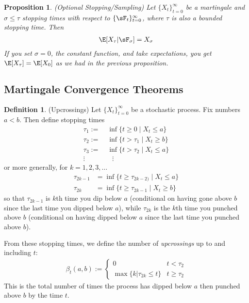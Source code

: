 \documentclass[12pt]{article}
\theoremstyle{plain}
\newtheorem{prop}[thm]{Proposition}
\theoremstyle{definition}
\newtheorem{defn}[thm]{Definition}
\theoremstyle{remark}
\newcommand{\tinfz}{_{t=0}^\infty}
\begin{document}
\begin{prop}\emph{(Optional Stopping/Sampling)}
Let $\{X_t\}\tinfz$ be a martingale and $\sigma \leq \tau$ stopping
times with respect to $\{\sF_t\}\tinfz$, where $\tau$ is also a bounded
stopping time. Then
\begin{align*}
  \E[X_\tau |\sF_\sigma] = X_\sigma
\end{align*}
If you set $\sigma=0$, the constant function, and take expectations, you
get $\E[X_\tau]=\E[X_0]$ as we had in the previous proposition.
\end{prop}

\clearpage
\subsection{Martingale Convergence Theorems}

\begin{defn}(Upcrossings)
Let $\{X_t\}\tinfz$ be a stochastic process. Fix numbers $a<b$. Then
define stopping times
\begin{align*}
  \tau_1 :=& \; \inf\{t\geq 0\;|\; X_t \leq a\} \\
  \tau_2 :=& \; \inf\{t> \tau_1\;|\; X_t \geq b\} \\
  \tau_3 :=& \; \inf\{t> \tau_2\;|\; X_t \leq a\} \\
  \vdots \quad & \quad \vdots
\end{align*}
or more generally, for $k=1,2,3,\ldots$
\begin{align*}
  \tau_{2k-1} &= \inf\{t\geq \tau_{2k-2)} \;|\; X_t \leq a\} \\
  \tau_{2k} &= \inf\{t\geq \tau_{2k-1} \;|\; X_t \geq b\}
\end{align*}
so that $\tau_{2k-1}$ is $k$th time you dip below $a$ (conditional on
having gone above $b$ since the last time you dipped below $a$), while
$\tau_{2k}$ is the $k$th time you punched above $b$ (conditional on
having dipped below $a$ since the last time you punched above $b$).

From these stopping times, we define the number of \emph{upcrossings} up
to and including $t$:
\begin{align*}
  \beta_t(a,b)
  :=
  \begin{cases}
    0 & t < \tau_2  \\
    \max\{k | \tau_{2k} \leq t\} & t \geq \tau_2
  \end{cases}
\end{align*}
This is the total number of times the process has dipped below $a$ then
punched above $b$ by the time $t$.
\end{defn}
\end{document}
